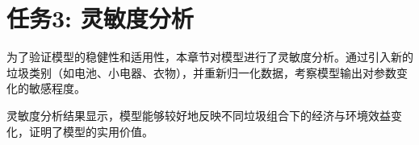 \section{任务3: 灵敏度分析}
为了验证模型的稳健性和适用性，本章节对模型进行了灵敏度分析。通过引入新的垃圾类别（如电池、小电器、衣物），并重新归一化数据，考察模型输出对参数变化的敏感程度。

灵敏度分析结果显示，模型能够较好地反映不同垃圾组合下的经济与环境效益变化，证明了模型的实用价值。
